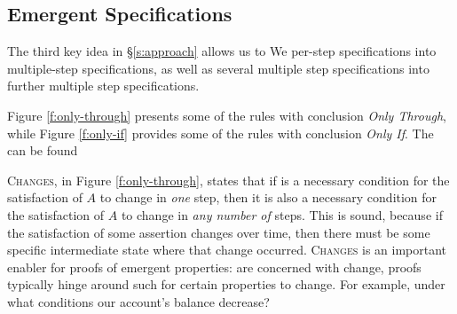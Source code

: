 %
\subsection{Emergent \Nec Specifications}
\label{s:emergent-proof}

The third key idea in \S \ref{s:approach}  allows us to
We
   per-step \Nec specifications into  
multiple-step \Nec specifications, as well as several  multiple step \Nec specifications into further multiple step \Nec specifications.

 Figure \ref{f:only-through}  {presents} some of the rules with conclusion \emph{Only Through}, while Figure \ref{f:only-if}
provides some of the rules with conclusion \emph{Only If}. 
The  can be found 


\textsc{Changes}, in Figure \ref{f:only-through}, 
{states that 
if    is a necessary condition for the satisfaction of $A$ to change  in \emph{one} step, then
it is also a  necessary condition for the satisfaction of $A$ to change  in \emph{any number of} steps.
This is sound, because if  the satisfaction of some assertion changes over time, then 
 there must be some specific intermediate state where that change occurred.}
\textsc{Changes} is an important %
 enabler for proofs of emergent properties:
  are concerned with  change,
 proofs typically hinge around such  for certain properties  %
to change. For example,
under what conditions  our account's balance decrease? 

